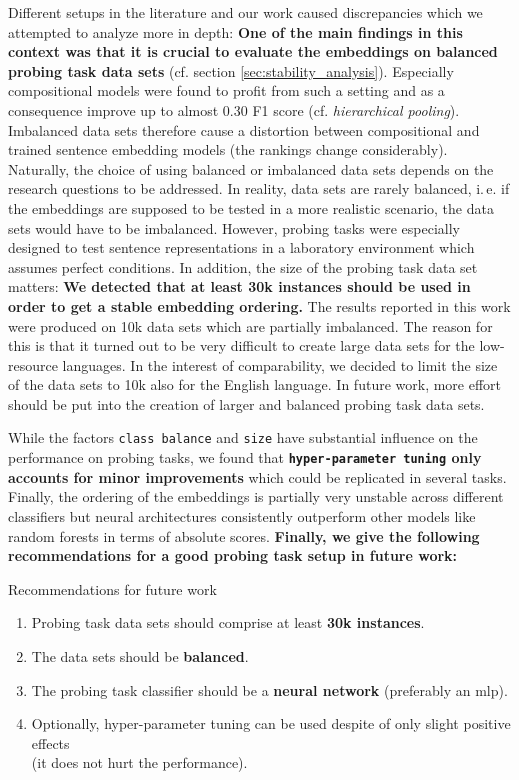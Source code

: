  Different setups in the literature and our work caused discrepancies which we attempted to analyze more in depth: \textbf{One of the main findings in this context was that it is crucial to evaluate the embeddings on balanced probing task data sets} (cf. section \vref{sec:stability_analysis}). Especially compositional models were found to profit from such a setting and as a consequence improve up to almost 0.30 F1 score (cf. \textit{hierarchical pooling}). Imbalanced data sets therefore cause a distortion between compositional and trained sentence embedding models (the rankings change considerably). Naturally, the choice of using balanced or imbalanced data sets depends on the research questions to be addressed. In reality, data sets are rarely balanced, i.\,e. if the embeddings are supposed to be tested in a more realistic scenario, the data sets would have to be imbalanced. However, probing tasks were especially designed to test sentence representations in a laboratory environment which assumes perfect conditions. In addition, the size of the probing task data set matters: \textbf{We detected that at least 30k instances should be used in order to get a stable embedding ordering.}  The results reported in this work were produced on 10k data sets which are partially imbalanced. The reason for this is that it turned out to be very difficult to create large data sets for the low-resource languages. In the interest of comparability, we decided to limit the size of the data sets to 10k also for the English language. In future work, more effort should be put into the creation of larger and balanced probing task data sets.

While the factors \texttt{class balance} and \texttt{size} have substantial influence on the performance on probing tasks, we found that \textbf{\texttt{hyper-parameter tuning} only accounts for minor improvements} which could be replicated in several tasks. Finally, the ordering of the embeddings is partially very unstable across different classifiers but neural architectures consistently outperform other models like random forests in terms of absolute scores. \textbf{Finally, we give the following recommendations for a good probing task setup in future work:}

\begin{tudbox}{Recommendations for future work}
\begin{enumerate}[label=\color{tud9c}\textbf{\theenumi.}]
	\setlength\itemsep{2.4em}
	\item Probing task data sets should comprise at least \textbf{30k instances}.
	\item The data sets should be \textbf{balanced}.
	\item The probing task classifier should be a \textbf{neural network} (preferably an \gls{mlp}).
	\item Optionally, hyper-parameter tuning can be used despite of only slight positive effects \\
		(it does not hurt the performance).
\end{enumerate}
\end{tudbox}

